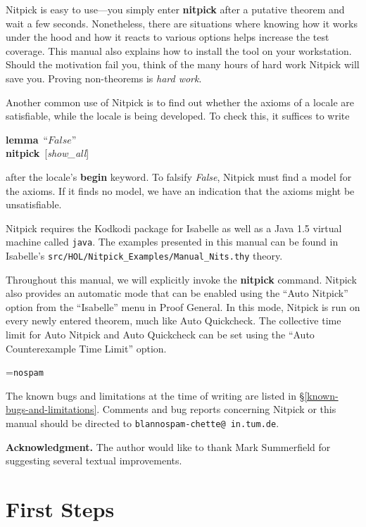 \documentclass[a4paper,12pt]{article}
\begin{document}
Nitpick is easy to use---you simply enter \textbf{nitpick} after a putative
theorem and wait a few seconds. Nonetheless, there are situations where knowing
how it works under the hood and how it reacts to various options helps
increase the test coverage. This manual also explains how to install the tool on
your workstation. Should the motivation fail you, think of the many hours of
hard work Nitpick will save you. Proving non-theorems is \textsl{hard work}.

Another common use of Nitpick is to find out whether the axioms of a locale are
satisfiable, while the locale is being developed. To check this, it suffices to
write

\prew
\textbf{lemma}~``$\textit{False}$'' \\
\textbf{nitpick}~[\textit{show\_all}]
\postw

after the locale's \textbf{begin} keyword. To falsify \textit{False}, Nitpick
must find a model for the axioms. If it finds no model, we have an indication
that the axioms might be unsatisfiable.

Nitpick requires the Kodkodi package for Isabelle as well as a Java 1.5 virtual
machine called \texttt{java}. The examples presented in this manual can be found
in Isabelle's \texttt{src/HOL/Nitpick\_Examples/Manual\_Nits.thy} theory.

Throughout this manual, we will explicitly invoke the \textbf{nitpick} command.
Nitpick also provides an automatic mode that can be enabled using the
``Auto Nitpick'' option from the ``Isabelle'' menu in Proof General. In this
mode, Nitpick is run on every newly entered theorem, much like Auto Quickcheck.
The collective time limit for Auto Nitpick and Auto Quickcheck can be set using
the ``Auto Counterexample Time Limit'' option.

\newbox\boxA
\setbox\boxA=\hbox{\texttt{nospam}}

The known bugs and limitations at the time of writing are listed in
\S\ref{known-bugs-and-limitations}. Comments and bug reports concerning Nitpick
or this manual should be directed to
\texttt{blan{\color{white}nospam}\kern-\wd\boxA{}chette@\allowbreak
in.\allowbreak tum.\allowbreak de}.

\smallskipamount

\textbf{Acknowledgment.} The author would like to thank Mark Summerfield for
suggesting several textual improvements.

\section{First Steps}
\label{first-steps}
\end{document}

